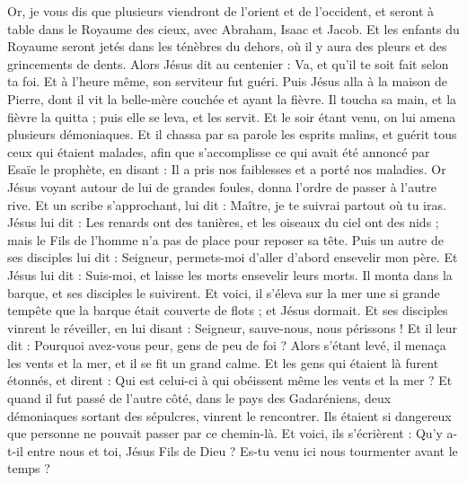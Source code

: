 \begin{multicols}{2}
Or, je vous dis que plusieurs viendront de l'orient et de l'occident, et seront à table dans le Royaume des cieux, avec Abraham, Isaac et Jacob.
Et les enfants du Royaume seront jetés dans les ténèbres du dehors, où il y aura des pleurs et des grincements de dents.
Alors Jésus dit au centenier : Va, et qu'il te soit fait selon ta foi. Et à l'heure même, son serviteur fut guéri.
Puis Jésus alla à la maison de Pierre, dont il vit la belle-mère couchée et ayant la fièvre.
Il toucha sa main, et la fièvre la quitta ; puis elle se leva, et les servit.
Et le soir étant venu, on lui amena plusieurs démoniaques. Et il chassa par sa parole les esprits malins, et guérit tous ceux qui étaient malades,
afin que s'accomplisse ce qui avait été annoncé par Esaïe le prophète, en disant : Il a pris nos faiblesses et a porté nos maladies.
Or Jésus voyant autour de lui de grandes foules, donna l'ordre de passer à l'autre rive.
Et un scribe s'approchant, lui dit : Maître, je te suivrai partout où tu iras.
Jésus lui dit : Les renards ont des tanières, et les oiseaux du ciel ont des nids ; mais le Fils de l'homme n'a pas de place pour reposer sa tête.
Puis un autre de ses disciples lui dit : Seigneur, permets-moi d'aller d'abord ensevelir mon père.
Et Jésus lui dit : Suis-moi, et laisse les morts ensevelir leurs morts.
Il monta dans la barque, et ses disciples le suivirent.
Et voici, il s'éleva sur la mer une si grande tempête que la barque était couverte de flots ; et Jésus dormait.
Et ses disciples vinrent le réveiller, en lui disant : Seigneur, sauve-nous, nous périssons !
Et il leur dit : Pourquoi avez-vous peur, gens de peu de foi ? Alors s'étant levé, il menaça les vents et la mer, et il se fit un grand calme.
Et les gens qui étaient là furent étonnés, et dirent : Qui est celui-ci à qui obéissent même les vents et la mer ?
Et quand il fut passé de l'autre côté, dans le pays des Gadaréniens, deux démoniaques sortant des sépulcres, vinrent le rencontrer. Ils étaient si dangereux que personne ne pouvait passer par ce chemin-là.
Et voici, ils s'écrièrent : Qu'y a-t-il entre nous et toi, Jésus Fils de Dieu ? Es-tu venu ici nous tourmenter avant le temps ?

\end{multicols}
